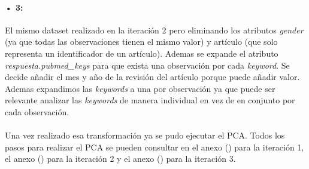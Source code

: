\paragraph{• 3: } \label{section:pca_case3}El mismo dataset realizado en la iteración 2 pero eliminando los atributos \textit{gender} (ya que todas las observaciones tienen el mismo valor) y artículo (que solo representa un identificador de un artículo). Ademas se expande el atributo \textit{respuesta.pubmed\_keys} para que exista una observación por cada \textit{keyword}. Se decide añadir el mes y año de la revisión del artículo porque puede añadir valor. Ademas expandimos las \textit{keywords} a una por observación ya que puede ser relevante analizar las \textit{keywords} de manera individual en vez de en conjunto por cada observación.

\paragraph{}
Una vez realizado esa transformación ya se pudo ejecutar el PCA. Todos los pasos para realizar el PCA se pueden consultar en el anexo () para la iteración 1, el anexo () para la iteración 2 y el anexo () para la iteración 3.
